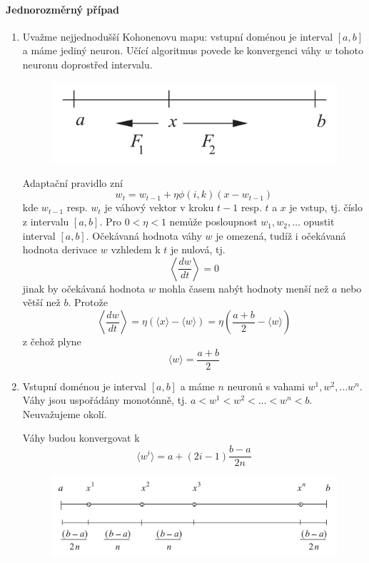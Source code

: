 \documentclass[11pt]{report} %
\numberwithin{equation}{section}
\begin{document}
\paragraph{Jednorozměrný případ}
\begin{enumerate}
\item Uvažme nejjednodušší Kohonenovu mapu: vstupní doménou je interval $[a,b]$ a máme jediný neuron. Učící algoritmus povede ke konvergenci váhy $w$ tohoto neuronu doprostřed intervalu.

\begin{figure}[h]
	\centering
	\includegraphics[scale=0.5]{img/kohonen_konv1.png}
\end{figure}

Adaptační pravidlo zní 
$$w_t = w_{t-1} + \eta\phi(i,k)(x - w_{t-1})$$
kde $w_{t-1}$ resp. $w_{t}$ je váhový vektor v kroku $t-1$ resp. $t$ a $x$ je vstup, tj. číslo z intervalu $[a,b]$. Pro $0 < \eta < 1$ nemůže posloupnost $w_1, w_2,\dots$ opustit interval $[a, b]$. Očekávaná hodnota váhy $w$ je omezená, tudíž i očekávaná hodnota derivace $w$ vzhledem k $t$ je nulová, tj.
$$\left\langle\frac{dw}{dt}\right\rangle = 0$$
jinak by očekávaná hodnota $w$ mohla časem nabýt hodnoty menší než $a$ nebo větší než $b$. Protože
$$\left\langle\frac{dw}{dt}\right\rangle = \eta(\langle x\rangle - \langle w\rangle) = \eta\left(\frac{a+b}{2} - \langle w \rangle \right)$$
z čehož plyne
$$\langle w \rangle = \frac{a+b}{2}$$	

\item Vstupní doménou je interval $[a,b]$ a máme $n$ neuronů s vahami $w^1, w^2, \dots w^n$. Váhy jsou uspořádány monotónně, tj. $a < w^1 < w^2 < \dots < w^n < b$. Neuvažujeme okolí.

Váhy budou konvergovat k 
$$\langle w^i \rangle = a + (2i-1)\frac{b-a}{2n}$$

\begin{figure}[h]
	\centering
	\includegraphics[scale=0.9]{img/kohonen_konv2.png}
\end{figure}
\end{enumerate}
\end{document}
